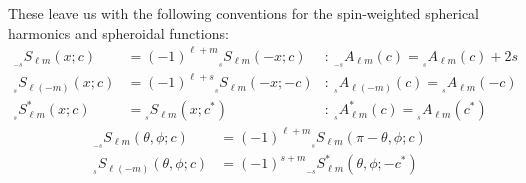 \documentclass[11pt]{article}
\newcommand{\swSH}[5][]{{}_{{}_{#2}}S^{#1}_{#3}(#4;#5)}
\newcommand{\swS}[5][]{{}_{{}_{#2}}S^{#1}_{#3}(#4;#5)}
\newcommand{\scA}[4][]{{}_{{}_{#2}}A^{#1}_{#3}(#4)}
\begin{document}
\noindent
These leave us with the following conventions for the spin-weighted spherical harmonics and spheroidal functions:
\begin{align}
\swS{-s}{\ell{m}}{x}{c} &= (-1)^{\ell+m}\swS{s}{\ell{m}}{-x}{c} 
           &:\ \scA{-s}{\ell{m}}{c} = \scA{s}{\ell{m}}{c} + 2s \\
\swS{s}{\ell(-m)}{x}{c} &= (-1)^{\ell+s}\swS{s}{\ell{m}}{-x}{-c} 
           &:\ \scA{s}{\ell(-m)}{c} = \scA{s}{\ell{m}}{-c} \\
\swS[*]{s}{\ell{m}}{x}{c} &= \swS{s}{\ell{m}}{x}{c^*} 
           &:\ \scA[*]{s}{\ell{m}}{c} = \scA{s}{\ell{m}}{c^*}
\end{align}
\begin{align}\label{eqn:swSHminuss}
\swSH{-s}{\ell{m}}{\theta,\phi}{c} &= (-1)^{\ell+m}\swSH{s}{\ell{m}}{\pi-\theta,\phi}{c} \\ \label{eqn:swSHminusm}
\swSH{s}{\ell(-m)}{\theta,\phi}{c} &= (-1)^{s+m}\swSH[*]{-s}{\ell{m}}{\theta,\phi}{-c^*}
\end{align}
\end{document}
